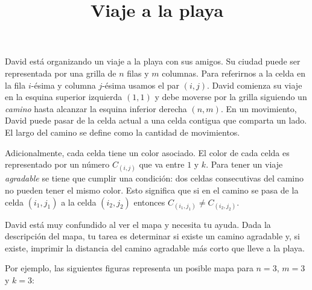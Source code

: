 \documentclass{oci}
\title{Viaje a la playa}
\begin{document}
\begin{problemDescription}
David está organizando un viaje a la playa con sus amigos.
%
Su ciudad puede ser representada por una grilla de $n$ filas y $m$ columnas.
%
Para referirnos a la celda en la fila $i$-ésima y columna $j$-ésima usamos el par
$(i,j)$.
%
David comienza su viaje en la esquina superior izquierda $(1, 1)$ y debe
moverse por la grilla siguiendo un \emph{camino} hasta alcanzar la esquina
inferior derecha $(n, m)$.
%
En un movimiento, David puede pasar de la celda actual a una celda contigua
que comparta un lado.
%
El largo del camino se define como la cantidad de movimientos.

Adicionalmente, cada celda tiene un color asociado.
%
El color de cada celda es representado por un número $C_{(i,j)}$ que va entre $1$ y $k$.
%
Para tener un viaje \emph{agradable} se tiene que cumplir una condición: dos celdas
consecutivas del camino no pueden tener el mismo color.
%
Esto significa que si en el camino se pasa de la celda $(i_1,j_1)$ a la celda $(i_2,j_2)$
entonces $C_{(i_1,j_1)} \neq C_{(i_2,j_2)}$.

David está muy confundido al ver el mapa y necesita tu ayuda.
%
Dada la descripción del mapa, tu tarea es determinar si existe un camino agradable
y, si existe, imprimir la distancia del camino agradable más corto que lleve a la
playa.

Por ejemplo, las siguientes figuras representa un posible mapa para $n=3$, $m=3$ y $k=3$:
\begin{figure}[!h]
\centering
{}
\end{figure}


\end{problemDescription}
\end{document}
